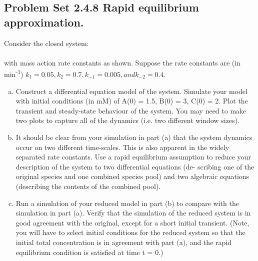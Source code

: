 \documentclass[paper=a4, fontsize=11pt]{scrartcl} %
\numberwithin{equation}{section} %
\numberwithin{figure}{section} %
\numberwithin{table}{section} %
\begin{document}
\subsection{Problem Set 2.4.8 Rapid equilibrium approximation.}
	Consider the closed system:\\
	\\
	with mass action rate constants as shown. Suppose the rate constants are (in min\textsuperscript{-1}) $k_{1} = 0.05, k_{2} = 0.7, k_{-1} = 0.005, and k_{-2} = 0.4$.
	\begin{enumerate}[a)]
		\item Construct a differential equation model of the system. Simulate your model with initial conditions (in mM) of A(0) = 1.5, B(0) = 3, C(0) = 2. Plot the transient and steady-state behaviour of the system. You may need to make two plots to capture all of the dynamics (i.e. two different window sizes).

		\item It should be clear from your simulation in part (a) that the system dynamics occur on two different time-scales. This is also apparent in the widely separated rate constants. Use a rapid equilibrium assumption to reduce your description of the system to two differential equations (de- scribing one of the original species and one combined species pool) and two algebraic equations (describing the contents of the combined pool).

		\item Run a simulation of your reduced model in part (b) to compare with the simulation in part (a). Verify that the simulation of the reduced system is in good agreement with the original, except for a short initial transient. (Note, you will have to select initial conditions for the reduced system so that the initial total concentration is in agreement with part (a), and the rapid equilibrium condition is satisfied at time t = 0.)
	\end{enumerate}
\end{document}
